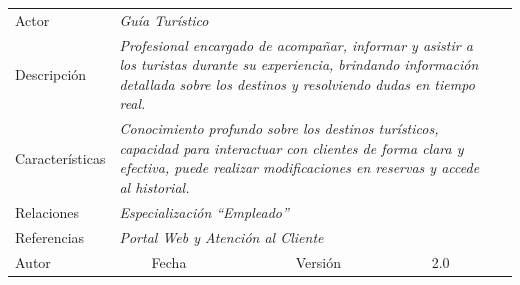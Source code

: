 \newpage

\begin{table}[H]
    \begin{tabular}{llllllll}
    \cline{1-7}
    \multicolumn{1}{|l|}{Actor}           & \multicolumn{4}{l|}{{\color[HTML]{A6A6A6} \textit{Guía Turístico}}}                                                               & \multicolumn{2}{l|}{\cellcolor[HTML]{E6E6E6}{\color[HTML]{A6A6A6} \textit{AC-4}}}                         &  \\ \cline{1-7}
    \multicolumn{1}{|l|}{Descripción}     & \multicolumn{6}{p{12cm}|}{{\color[HTML]{A6A6A6} \textit{Profesional encargado de acompañar, informar y asistir a los turistas durante su experiencia, brindando información detallada sobre los destinos y resolviendo dudas en tiempo real.}}}     &  \\ \cline{1-7}
    \multicolumn{1}{|l|}{Características} & \multicolumn{6}{p{12cm}|}{{\color[HTML]{A6A6A6} \textit{Conocimiento profundo sobre los destinos turísticos, capacidad para interactuar con clientes de forma clara y efectiva, puede realizar modificaciones en reservas y accede al historial.}}} &  \\ \cline{1-7}
    \multicolumn{1}{|l|}{Relaciones}      & \multicolumn{6}{p{12cm}|}{{\color[HTML]{A6A6A6} \textit{Especialización “Empleado”}}}                                                                                                                                                               &  \\ \cline{1-7}
    \multicolumn{1}{|l|}{Referencias}     & \multicolumn{6}{l|}{{\color[HTML]{A6A6A6} \textit{Portal Web y Atención al Cliente}}}                                                                                                                                                         &  \\ \cline{1-7}
    \multicolumn{1}{|l|}{Autor}           & \multicolumn{1}{l|}{}              & \multicolumn{1}{l|}{Fecha}              & \multicolumn{1}{l|}{}              & \multicolumn{2}{l|}{Versión}                            & \multicolumn{1}{l|}{2.0}                                        &  \\ \cline{1-7}
    \end{tabular}
    \end{table}

